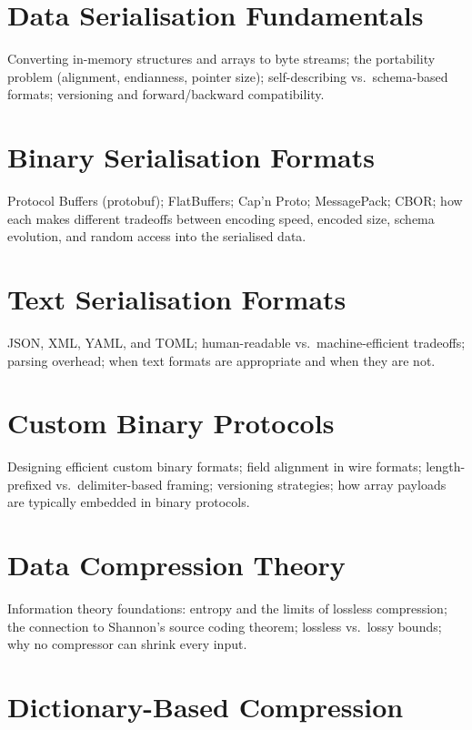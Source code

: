 \chapter{Data Serialisation Fundamentals}
\label{ch:serialisation-fundamentals}

Converting in-memory structures and arrays to byte streams; the portability
problem (alignment, endianness, pointer size); self-describing vs.\
schema-based formats; versioning and forward/backward compatibility.

\chapter{Binary Serialisation Formats}
\label{ch:binary-serialisation}

Protocol Buffers (protobuf); FlatBuffers; Cap'n Proto; MessagePack; CBOR;
how each makes different tradeoffs between encoding speed, encoded size,
schema evolution, and random access into the serialised data.

\chapter{Text Serialisation Formats}
\label{ch:text-serialisation}

JSON, XML, YAML, and TOML; human-readable vs.\ machine-efficient tradeoffs;
parsing overhead; when text formats are appropriate and when they are not.

\chapter{Custom Binary Protocols}
\label{ch:binary-protocols}

Designing efficient custom binary formats; field alignment in wire formats;
length-prefixed vs.\ delimiter-based framing; versioning strategies; how
array payloads are typically embedded in binary protocols.

\chapter{Data Compression Theory}
\label{ch:compression-theory}

Information theory foundations: entropy and the limits of lossless
compression; the connection to Shannon's source coding theorem; lossless
vs.\ lossy bounds; why no compressor can shrink every input.

\chapter{Dictionary-Based Compression}
\label{ch:dictionary-compression}

